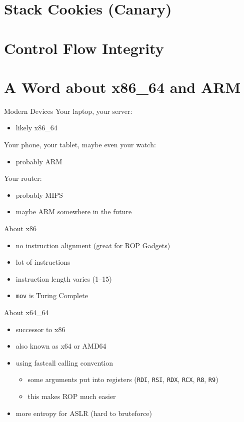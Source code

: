 \documentclass[beamer]{uibk}
\begin{document}
\section{Stack Cookies (Canary)}

\section{Control Flow Integrity}

\section{A Word about x86\_64 and ARM}

\begin{frame}{Modern Devices}
    Your laptop, your server:
    \begin{itemize}
        \item likely x86\_64
    \end{itemize}
    \medskip
    \pause
    Your phone, your tablet, maybe even your watch:
    \begin{itemize}
        \item probably ARM
    \end{itemize}
    \medskip
    \pause
    Your router:
    \begin{itemize}
        \item probably MIPS
        \item maybe ARM somewhere in the future
    \end{itemize}
\end{frame}

\begin{frame}{About x86}
    \begin{itemize}
        \item no instruction alignment (great for ROP Gadgets)
        \item lot of instructions
        \item instruction length varies (\SIrange{1}{15}{\byte})
        \item \texttt{mov} is Turing Complete
    \end{itemize}
\end{frame}

\begin{frame}{About x64\_64}
    \begin{itemize}
        \item successor to x86
        \item also known as x64 or AMD64
        \item using fastcall calling convention
            \begin{itemize}
                \item some arguments put into registers (\texttt{RDI},
                    \texttt{RSI}, \texttt{RDX}, \texttt{RCX}, \texttt{R8},
                    \texttt{R9})
                \item this makes ROP much easier
            \end{itemize}
        \item more entropy for ASLR (hard to bruteforce)
    \end{itemize}
\end{frame}
\end{document}
